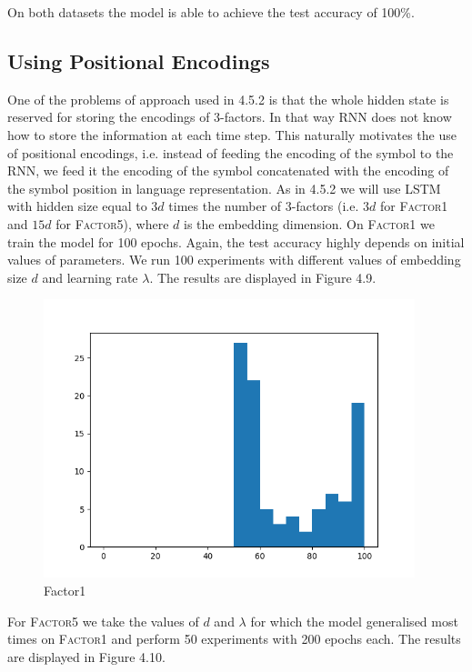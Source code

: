 \documentclass[titlepage]{report}
\begin{document}
\noindent
On both datasets the model is able to achieve the test accuracy of 100\%.

\subsection{Using Positional Encodings}

One of the problems of approach used in 4.5.2 is that the whole hidden state is reserved for storing the encodings of 3-factors. In that way RNN does not know how to store the information at each time step. This naturally motivates the use of positional encodings, i.e. instead of feeding the encoding of the symbol to the RNN, we feed it the encoding of the symbol concatenated with the encoding of the symbol position in language representation. As in 4.5.2 we will use LSTM with hidden size equal to $3d$ times the number of 3-factors (i.e. $3d$ for \textsc{Factor1} and $15d$ for \textsc{Factor5}), where $d$ is the embedding dimension. On \textsc{Factor1} we train the model for 100 epochs. Again, the test accuracy highly depends on initial values of parameters. We run 100 experiments with different values of embedding size $d$ and learning rate $\lambda$. The results are displayed in Figure 4.9.

\begin{figure}[H]
\centering
\includegraphics[width = 108mm]{figures/histograms/factor1/auto_pos/10-01}
\caption{Factor1}
\end{figure}

\noindent
For \textsc{Factor5} we take the values of $d$ and $\lambda$ for which the model generalised most times on \textsc{Factor1} and perform 50 experiments with 200 epochs each. The results are displayed in Figure 4.10.
\end{document}

